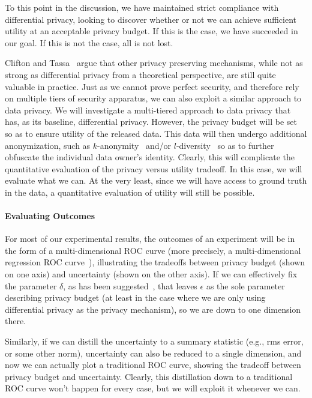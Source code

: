 To this point in the discussion, we have maintained strict compliance
with differential privacy, looking to discover whether or not we can
achieve sufficient utility at an acceptable privacy budget.  If this is
the case, we have succeeded in our goal.  If this is not the case, all
is not lost.

Clifton and Tassa~\cite{ct13} argue that other privacy preserving
mechanisms, while not as strong as differential privacy from a
theoretical perspective, are still quite valuable in practice.
Just as we cannot prove perfect security, and therefore rely on multiple
tiers of security apparatus, we can also exploit a similar approach
to data privacy.  We will investigate a multi-tiered approach to data
privacy that has, as its baseline, differential privacy.  However,
the privacy budget will be set so as to ensure utility of the released
data.  This data will then undergo additional anonymization, such as
$k$-anonymity~\cite{samarati01,sweeney02}
and/or $l$-diversity~\cite{mkgv07} so as to further
obfuscate the individual data owner's identity.
Clearly, this will complicate the quantitative evaluation of the
privacy versus utility tradeoff. In this case, we will evaluate what we
can.  At the very least, since we will have access to ground truth in
the data, a quantitative evaluation of utility will still be possible.

\paragraph{Evaluating Outcomes}
For most of our experimental results, the outcomes of an experiment
will be in the form of a multi-dimensional ROC curve
(more precisely, a multi-dimensional
regression ROC curve~\cite{Fawcett06,HO13,Mossman99}), illustrating
the tradeoffs between privacy budget (shown on one axis) and uncertainty
(shown on the other axis). If we can effectively fix the parameter $\delta$,
as has been suggested~\cite{dr14}, that leaves $\epsilon$ as the
sole parameter describing privacy budget (at least in the case where
we are only using differential privacy as the privacy mechanism), so we
are down to one dimension there.

Similarly, if we can distill the uncertainty to a summary statistic
(e.g., rms error, or some other norm), uncertainty can also be reduced
to a single dimension, and now we can actually plot a traditional ROC
curve, showing the tradeoff between privacy budget and uncertainty.
Clearly, this distillation down to a traditional ROC curve won't happen
for every case, but we will exploit it whenever we can.

